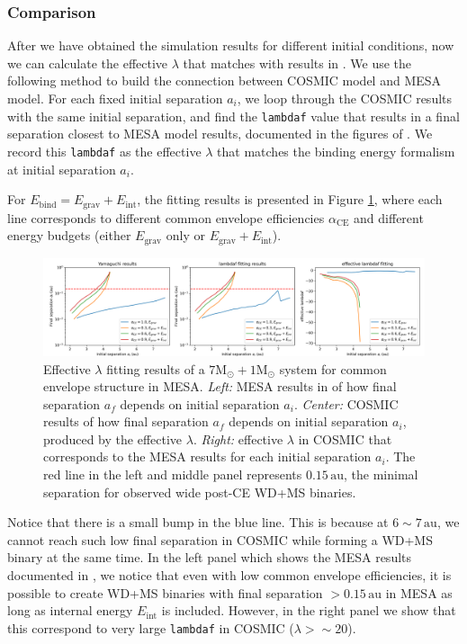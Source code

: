 \documentclass[12pt]{article}
\newcommand{\Msun}{\mathrm{M_{\odot}}}
\newcommand{\alphace}{\alpha_{\mathrm{CE}}}
\newcommand{\Ebind}{E_{\mathrm{bind}}}
\newcommand{\Egrav}{E_{\mathrm{grav}}}
\newcommand{\Eint}{E_{\mathrm{int}}}
\newcommand{\au}{\, \mathrm{au}}
\begin{document}
\subsubsection{Comparison}
After we have obtained the simulation results for different initial conditions, now we can calculate the effective $\lambda$ that matches with results in \cite{yamaguchi_hi}. We use the following method to build the connection between COSMIC model and MESA model. For each fixed initial separation $a_i$, we loop through the COSMIC results with the same initial separation, and find the \verb|lambdaf| value that results in a final separation closest to MESA model results, documented in the figures of \cite{yamaguchi_hi}. We record this \verb|lambdaf| as the effective $\lambda$ that matches the binding energy formalism at initial separation $a_i$.

For $\Ebind = \Egrav + \Eint$, the fitting results is presented in Figure \ref{fit_hi}, where each line corresponds to different common envelope efficiencies $\alphace$ and different energy budgets (either $\Egrav$ only or $\Egrav + \Eint$).

\begin{figure}
    \centering
    \includegraphics[width=1\linewidth]{fig/7+1fit.png}
    \caption{Effective $\lambda$ fitting results of a $7\Msun + 1\Msun$ system for common envelope structure in MESA. \emph{Left:} MESA results in \cite{yamaguchi_hi} of how final separation $a_f$ depends on initial separation $a_i$. \emph{Center:} COSMIC results of how final separation $a_f$ depends on initial separation $a_i$, produced by the effective $\lambda$. \emph{Right:} effective $\lambda$ in COSMIC that corresponds to the MESA results for each initial separation $a_i$. The red line in the left and middle panel represents $0.15 \au$, the minimal separation for observed wide post-CE WD+MS binaries.}
    \label{fit_hi}
\end{figure}

Notice that there is a small bump in the blue line. This is because at $6 \sim 7 \au$, we cannot reach such low final separation in COSMIC while forming a WD+MS binary at the same time. In the left panel which shows the MESA results documented in \cite{yamaguchi_hi}, we notice that even with low common envelope efficiencies, it is possible to create WD+MS binaries with final separation $>0.15 \au$ in MESA as long as internal energy $\Eint$ is included. However, in the right panel we show that this correspond to very large \verb|lambdaf| in COSMIC ($\lambda > \sim 20$).
\end{document}
